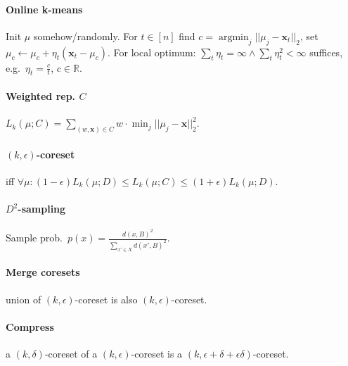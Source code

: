 \documentclass[11pt]{scrartcl}
\DeclareMathOperator{\argmin}{argmin}
\newcommand{\eps}{\epsilon}
\newcommand{\R}{\mathbb{R}}
\begin{document}
\begin{multicols}{3}
\paragraph{Online k-means} Init $\mu$ somehow/randomly.
For $t \in [n]$ find $c = \argmin_j||\mu_j-\bm x_t||_2$, set $\mu_c \leftarrow \mu_c + \eta_t(\bm x_t - \mu_c)$. For local optimum: $\sum_t \eta_t = \infty \wedge \sum_t \eta_t^2 < \infty$ suffices, e.g.\ $\eta_t = \frac{c}{t}$, $c \in \R$.

\paragraph{Weighted rep. $C$} $L_k(\mu;C) = \sum_{(w,\bm x)\in C}w\cdot\min_j||\mu_j - \bm x||_2^2$.

\paragraph{$(k,\eps)$-coreset} iff $\forall\mu: (1-\eps)L_k(\mu;D) \leq L_k(\mu;C) \leq (1+\eps)L_k(\mu;D)$.

\paragraph{$D^2$-sampling}
Sample prob.\ $p(x) = \frac{d(x,B)^2}{\sum_{x' \in X} d(x', B)^2}$.


\paragraph{Merge coresets} union of $(k,\eps)$-coreset is also $(k,\eps)$-coreset.

\paragraph{Compress} a $(k,\delta)$-coreset of a $(k,\eps)$-coreset is a $(k,\eps+\delta+\eps\delta)$-coreset.


\end{multicols}
\end{document}

